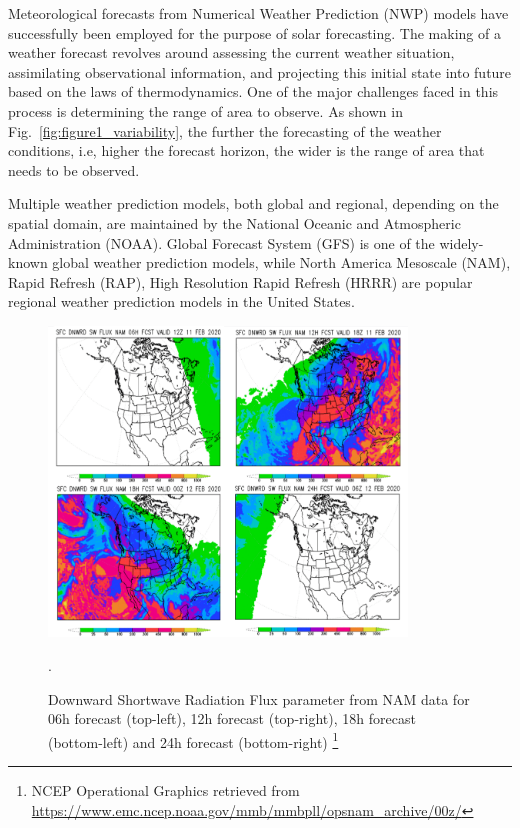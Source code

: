Meteorological forecasts from Numerical Weather Prediction (NWP) models have successfully been employed for the purpose of solar forecasting. The making of a weather forecast revolves around assessing the current weather situation, assimilating observational information, and projecting this initial state into future based on the laws of thermodynamics. One of the major challenges faced in this process is determining the range of area to observe. As shown in Fig.~\ref{fig:figure1_variability}, the further the forecasting of the weather conditions, i.e, higher the forecast horizon, the wider is the range of area that needs to be observed. 

\par Multiple weather prediction models, both global and regional, depending on the spatial domain, are maintained by the National Oceanic and Atmospheric Administration (NOAA). Global Forecast System (GFS) is one of the widely-known global weather prediction models, while North America Mesoscale (NAM), Rapid Refresh (RAP), High Resolution Rapid Refresh (HRRR) are popular regional weather prediction models in the United States.

\begin{figure}[htbp]
    \begin{center}
    	\includegraphics[width=0.85\textwidth]{chapter3/fig_nam_dswrf.png}
    	\label{fig:fig_nam_dswrf}
    	\caption{Downward Shortwave Radiation Flux parameter from NAM data for 06h forecast (top-left), 12h forecast (top-right), 18h forecast (bottom-left) and 24h forecast (bottom-right) \protect\footnote{NCEP Operational Graphics retrieved from \url{https://www.emc.ncep.noaa.gov/mmb/mmbpll/opsnam_archive/00z/}}}.
    \end{center}
\end{figure}

